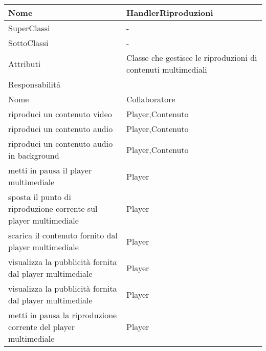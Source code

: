 \begin{center}
    \begin{tabular}{ |p{3cm}|p{3cm}|p{3cm}|p{3cm}| }
        \hline
        Nome & \multicolumn{3}{|p{9cm}|}{HandlerRiproduzioni} \\\hline
        SuperClassi & \multicolumn{3}{|p{9cm}|}{-} \\\hline
        SottoClassi & \multicolumn{3}{|p{9cm}|}{-} \\\hline
        Attributi & \multicolumn{3}{|p{9cm}|}{Classe che gestisce le riproduzioni di contenuti multimediali} \\\hline
        \multicolumn{4}{|p{12cm}|}{Responsabilit\'a} \\\hline
        \multicolumn{2}{|p{6cm}|}{Nome} & \multicolumn{2}{|p{6cm}|}{Collaboratore} \\\hline
        \multicolumn{2}{|p{6cm}|}{riproduci un contenuto video} & \multicolumn{2}{|p{6cm}|}{Player,Contenuto} \\\hline
        \multicolumn{2}{|p{6cm}|}{riproduci un contenuto audio} & \multicolumn{2}{|p{6cm}|}{Player,Contenuto} \\\hline
        \multicolumn{2}{|p{6cm}|}{riproduci un contenuto audio in background} & \multicolumn{2}{|p{6cm}|}{Player,Contenuto} \\\hline
        \multicolumn{2}{|p{6cm}|}{metti in pausa il player multimediale} & \multicolumn{2}{|p{6cm}|}{Player} \\\hline
        \multicolumn{2}{|p{6cm}|}{sposta il punto di riproduzione corrente sul player multimediale} & \multicolumn{2}{|p{6cm}|}{Player} \\\hline
        \multicolumn{2}{|p{6cm}|}{scarica il contenuto fornito dal player multimediale} & \multicolumn{2}{|p{6cm}|}{Player} \\\hline
        \multicolumn{2}{|p{6cm}|}{visualizza la pubblicità fornita dal player multimediale} & \multicolumn{2}{|p{6cm}|}{Player} \\\hline
        \multicolumn{2}{|p{6cm}|}{visualizza la pubblicità fornita dal player multimediale} & \multicolumn{2}{|p{6cm}|}{Player} \\\hline
        \multicolumn{2}{|p{6cm}|}{metti in pausa la riproduzione corrente del player multimediale} & \multicolumn{2}{|p{6cm}|}{Player} \\\hline
    \end{tabular}
\end{center}

